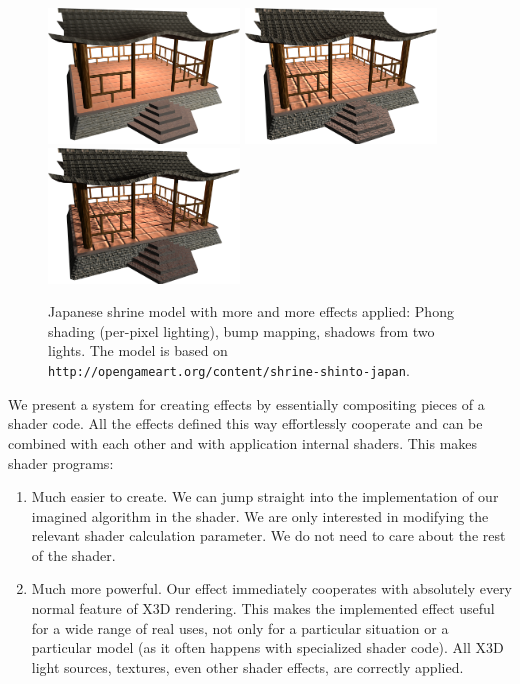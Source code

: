 \documentclass{egpubl}
\begin{document}
\begin{figure}[t]
  \centering
  \includegraphics[width=2.0in]{rhan_shrine_1_per_pixel_lighting}
  \includegraphics[width=2.0in]{rhan_shrine_2_bump_mapping}
  \includegraphics[width=2.0in]{rhan_shrine_5_everything}
  \caption{Japanese shrine model with more and more effects applied:
Phong shading (per-pixel lighting), bump mapping, shadows from two lights.
The model is based on \texttt{http://opengameart.org/content/shrine-shinto-japan}.}
  \label{fig_bump_mapping_shadows}
\end{figure}

We present a system for creating effects by essentially compositing
pieces of a shader code. All the effects defined this way effortlessly
cooperate and can be combined with each other and with application internal
shaders. This makes shader programs:

\begin{enumerate}
\item Much easier to create. We can jump straight into the implementation
  of our imagined algorithm in the shader.
  We are only interested in modifying the relevant shader calculation
  parameter. We do not need to care about the rest of the shader.

\item Much more powerful. Our effect
  immediately cooperates with absolutely every normal feature of X3D rendering.
  This makes the implemented effect useful for a wide range of real uses,
  not only for a particular situation or a particular model (as it often happens
  with specialized shader code).
  All X3D light sources, textures, even other shader effects,
  are correctly applied.
\end{enumerate}
\end{document}

